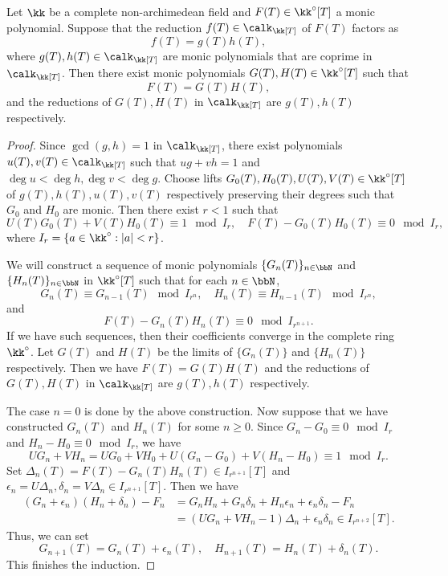 \begin{theorem}\label{prop:Hensel_lemma}
        Let \(\kk\) be a complete non-archimedean field and \(F(T) \in \kk^\circ[T]\) a monic polynomial.
        Suppose that the reduction \(f(T) \in \calk_\kk[T]\) of \(F(T)\) factors as
        \[ f(T) = g(T) h(T), \]
        where \(g(T), h(T) \in \calk_\kk[T]\) are monic polynomials that are coprime in \(\calk_\kk[T]\).
        Then there exist monic polynomials \(G(T), H(T) \in \kk^\circ[T]\) such that
        \[ F(T) = G(T) H(T), \]
        and the reductions of \(G(T), H(T)\) in \(\calk_\kk[T]\) are \(g(T), h(T)\) respectively.
    \end{theorem}
    \begin{proof}
        Since \(\gcd(g,h) = 1\) in \(\calk_\kk[T]\), there exist polynomials \(u(T), v(T) \in \calk_\kk[T]\) such that \(ug + vh = 1\) and \(\deg u < \deg h, \deg v < \deg g\).
        Choose lifts \(G_0(T), H_0(T), U(T), V(T) \in \kk^\circ[T]\) of \(g(T), h(T), u(T), v(T)\) respectively preserving their degrees such that \(G_0\) and \(H_0\) are monic.
        Then there exist \(r<1\) such that 
        \[ U(T) G_0(T) + V(T) H_0(T) \equiv 1 \mod I_{r},\quad F(T) - G_0(T) H_0(T) \equiv 0 \mod I_{r}, \]
        where \(I_{r} = \{ a \in \kk^\circ : |a| < r \}\).

        We will construct a sequence of monic polynomials \(\{G_n(T)\}_{n \in \bbN}\) and \(\{H_n(T)\}_{n \in \bbN}\) in \(\kk^\circ[T]\) such that for each \(n \in \bbN\),
        \[ G_n(T) \equiv G_{n-1}(T) \mod I_{r^n}, \quad H_n(T) \equiv H_{n-1}(T) \mod I_{r^n}, \]
        and
        \[ F(T) - G_n(T) H_n(T) \equiv 0 \mod I_{r^{n+1}}. \]
        If we have such sequences, then their coefficients converge in the complete ring \(\kk^\circ\).
        Let \(G(T)\) and \(H(T)\) be the limits of \(\{G_n(T)\}\) and \(\{H_n(T)\}\) respectively.
        Then we have \(F(T) = G(T) H(T)\) and the reductions of \(G(T), H(T)\) in \(\calk_\kk[T]\) are \(g(T), h(T)\) respectively.

        The case \(n=0\) is done by the above construction.
        Now suppose that we have constructed \(G_n(T)\) and \(H_n(T)\) for some \(n \geq 0\).
        Since \(G_n - G_0 \equiv 0 \mod I_{r}\) and \(H_n - H_0 \equiv 0 \mod I_{r}\), we have
        \[ U G_n + V H_n = U G_0 + V H_0 + U (G_n - G_0) + V (H_n - H_0) \equiv 1 \mod I_{r}. \]
        Set \(\Delta_n(T) = F(T) - G_n(T) H_n(T) \in I_{r^{n+1}}[T]\) and \(\epsilon_n = U \Delta_n, \delta_n = V \Delta_n \in I_{r^{n+1}}[T]\).
        Then we have 
        \begin{align*}
            (G_n + \epsilon_n)(H_n + \delta_n) - F_n &= G_n H_n + G_n \delta_n + H_n \epsilon_n + \epsilon_n \delta_n - F_n \\
            &= (U G_n + V H_n - 1) \Delta_n + \epsilon_n \delta_n \in I_{r^{n+2}}[T].
        \end{align*}
        Thus, we can set
        \[ G_{n+1}(T) = G_n(T) + \epsilon_n(T), \quad H_{n+1}(T) = H_n(T) + \delta_n(T). \]
        This finishes the induction.
    \end{proof}

